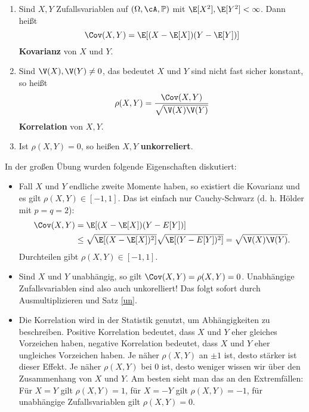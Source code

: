 \begin{deff}\abs
	\begin{enumerate}[label=(\roman*)]
		\item Sind $X,Y$ Zufallsvariablen auf $(\Omega, \cA, \mathbb{P})$ mit $\E[X^2],\E[Y^2] < \infty$. Dann heißt 
		$$\Cov(X,Y) = \E[(X - \E[X])(Y - \E[Y])]$$ \textbf{Kovarianz} von $X$ und $Y$.
		\item Sind $\V(X), \V(Y) \neq 0$, das bedeutet $X$ und $Y$ sind nicht fast sicher konstant, so heißt \[ \rho(X,Y) = \frac{\Cov(X,Y)}{\sqrt{\V(X)\V(Y)}} \] \textbf{Korrelation} von $X, Y$.
		\item Ist $\rho(X,Y) = 0$, so heißen $X,Y$ \textbf{unkorreliert}.
	\end{enumerate} 
\end{deff}
In der gro\ss en \"Ubung wurden folgende Eigenschaften diskutiert:
\begin{bem}\abs
\begin{itemize}
	\item Fall $X$ und $Y$ endliche zweite Momente haben, so existiert die Kovarianz und es gilt $\rho(X,Y)\in [-1,1]$. Das ist einfach nur Cauchy-Schwarz (d. h. H\"older mit $p=q=2$):
	\begin{align*}
		\Cov(X,Y)&= \E[(X - \E[X])(Y - E[Y])]\\
		&\leq  \sqrt{\E[(X - \E[X])^2]} \sqrt{ \E[(Y - E[Y])^2]}=\sqrt{\V(X)\V(Y)}.
	\end{align*}
	Durchteilen gibt $\rho(X,Y)\in [-1,1]$.
	\item Sind $X$ und $Y$ unabh\"angig, so gilt $\Cov(X,Y)=\rho(X,Y)=0$. Unabh\"angige Zufallsvariablen sind also auch unkorelliert! Das folgt sofort durch Ausmultiplizieren und Satz \ref{un}. 
	\item Die Korrelation wird in der Statistik genutzt, um Abh\"angigkeiten zu beschreiben. Positive Korrelation bedeutet, dass $X$ und $Y$ eher gleiches Vorzeichen haben, negative Korrelation bedeutet, dass $X$ und $Y$ eher ungleiches Vorzeichen haben. Je n\"aher $\rho(X,Y)$ an $\pm 1$ ist, desto st\"arker ist dieser Effekt. Je n\"aher $\rho(X,Y)$ bei $0$ ist, desto weniger wissen wir \"uber den Zusammenhang von $X$ und $Y$. Am besten sieht man das an den Extremf\"allen: F\"ur $X=Y$ gilt $\rho(X,Y)=1$, f\"ur $X=-Y$ gilt $\rho(X,Y)=-1$, f\"ur unabh\"angige Zufallsvariablen gilt $\rho(X,Y)=0$.
\end{itemize}
\end{bem}

\marginpar{\textcolor{red}{Vorlesung 22}}

